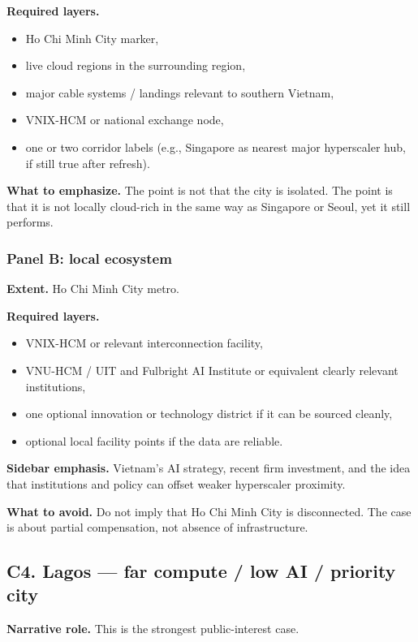 \documentclass[11pt]{article}
\begin{document}
\textbf{Required layers.}
\begin{itemize}[leftmargin=1.4em,itemsep=0.18em]
    \item Ho Chi Minh City marker,
    \item live cloud regions in the surrounding region,
    \item major cable systems / landings relevant to southern Vietnam,
    \item VNIX-HCM or national exchange node,
    \item one or two corridor labels (e.g., Singapore as nearest major hyperscaler hub, if still true after refresh).
\end{itemize}

\textbf{What to emphasize.} The point is not that the city is isolated. The point is that it is not locally cloud-rich in the same way as Singapore or Seoul, yet it still performs.

\subsubsection*{Panel B: local ecosystem}
\textbf{Extent.} Ho Chi Minh City metro.

\textbf{Required layers.}
\begin{itemize}[leftmargin=1.4em,itemsep=0.18em]
    \item VNIX-HCM or relevant interconnection facility,
    \item VNU-HCM / UIT and Fulbright AI Institute or equivalent clearly relevant institutions,
    \item one optional innovation or technology district if it can be sourced cleanly,
    \item optional local facility points if the data are reliable.
\end{itemize}

\textbf{Sidebar emphasis.} Vietnam's AI strategy, recent firm investment, and the idea that institutions and policy can offset weaker hyperscaler proximity.

\textbf{What to avoid.} Do not imply that Ho Chi Minh City is disconnected. The case is about partial compensation, not absence of infrastructure.

\subsection{C4. Lagos --- far compute / low AI / priority city}

\textbf{Narrative role.} This is the strongest public-interest case.
\end{document}
